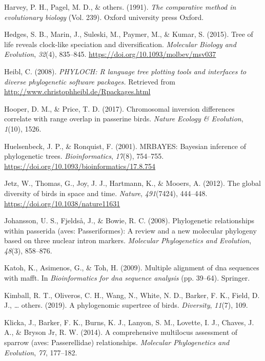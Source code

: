 \documentclass[english,man]{apa6}
\begin{document}
\leavevmode\hypertarget{ref-harvey1991comparative}{}%
Harvey, P. H., Pagel, M. D., \& others. (1991). \emph{The comparative method in evolutionary biology} (Vol. 239). Oxford university press Oxford.

\leavevmode\hypertarget{ref-Hedges2015}{}%
Hedges, S. B., Marin, J., Suleski, M., Paymer, M., \& Kumar, S. (2015). Tree of life reveals clock-like speciation and diversification. \emph{Molecular Biology and Evolution}, \emph{32}(4), 835--845. \url{https://doi.org/10.1093/molbev/msv037}

\leavevmode\hypertarget{ref-Heibl2008}{}%
Heibl, C. (2008). \emph{PHYLOCH: R language tree plotting tools and interfaces to diverse phylogenetic software packages.} Retrieved from \url{http://www.christophheibl.de/Rpackages.html}

\leavevmode\hypertarget{ref-hooper2017chromosomal}{}%
Hooper, D. M., \& Price, T. D. (2017). Chromosomal inversion differences correlate with range overlap in passerine birds. \emph{Nature Ecology \& Evolution}, \emph{1}(10), 1526.

\leavevmode\hypertarget{ref-Huelsenbeck2001}{}%
Huelsenbeck, J. P., \& Ronquist, F. (2001). MRBAYES: Bayesian inference of phylogenetic trees. \emph{Bioinformatics}, \emph{17}(8), 754--755. \url{https://doi.org/10.1093/bioinformatics/17.8.754}

\leavevmode\hypertarget{ref-Jetz2012}{}%
Jetz, W., Thomas, G., Joy, J. J., Hartmann, K., \& Mooers, A. (2012). The global diversity of birds in space and time. \emph{Nature}, \emph{491}(7424), 444--448. \url{https://doi.org/10.1038/nature11631}

\leavevmode\hypertarget{ref-johansson2008phylogenetic}{}%
Johansson, U. S., Fjeldså, J., \& Bowie, R. C. (2008). Phylogenetic relationships within passerida (aves: Passeriformes): A review and a new molecular phylogeny based on three nuclear intron markers. \emph{Molecular Phylogenetics and Evolution}, \emph{48}(3), 858--876.

\leavevmode\hypertarget{ref-katoh2009multiple}{}%
Katoh, K., Asimenos, G., \& Toh, H. (2009). Multiple alignment of dna sequences with mafft. In \emph{Bioinformatics for dna sequence analysis} (pp. 39--64). Springer.

\leavevmode\hypertarget{ref-kimball2019phylogenomic}{}%
Kimball, R. T., Oliveros, C. H., Wang, N., White, N. D., Barker, F. K., Field, D. J., \ldots{} others. (2019). A phylogenomic supertree of birds. \emph{Diversity}, \emph{11}(7), 109.

\leavevmode\hypertarget{ref-klicka2014comprehensive}{}%
Klicka, J., Barker, F. K., Burns, K. J., Lanyon, S. M., Lovette, I. J., Chaves, J. A., \& Bryson Jr, R. W. (2014). A comprehensive multilocus assessment of sparrow (aves: Passerellidae) relationships. \emph{Molecular Phylogenetics and Evolution}, \emph{77}, 177--182.
\end{document}
